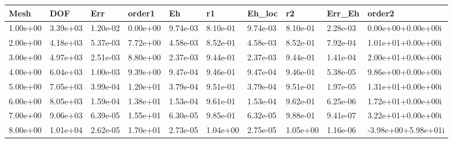 \begin{tabular}{llllllllll}
Mesh & DOF & Err & order1 & Eh & r1 & Eh_loc & r2 & Err_Eh & order2 \\ 
\hline 
1.00e+00 & 3.39e+03 & 1.20e-02 & 0.00e+00 & 9.74e-03 & 8.10e-01 & 9.74e-03 & 8.10e-01 & 2.28e-03 &  0.00e+00+0.00e+00i \\ 
2.00e+00 & 4.18e+03 & 5.37e-03 & 7.72e+00 & 4.58e-03 & 8.52e-01 & 4.58e-03 & 8.52e-01 & 7.92e-04 &  1.01e+01+0.00e+00i \\ 
3.00e+00 & 4.97e+03 & 2.51e-03 & 8.80e+00 & 2.37e-03 & 9.44e-01 & 2.37e-03 & 9.44e-01 & 1.41e-04 &  2.00e+01+0.00e+00i \\ 
4.00e+00 & 6.04e+03 & 1.00e-03 & 9.39e+00 & 9.47e-04 & 9.46e-01 & 9.47e-04 & 9.46e-01 & 5.38e-05 &  9.86e+00+0.00e+00i \\ 
5.00e+00 & 7.05e+03 & 3.99e-04 & 1.20e+01 & 3.79e-04 & 9.51e-01 & 3.79e-04 & 9.51e-01 & 1.97e-05 &  1.31e+01+0.00e+00i \\ 
6.00e+00 & 8.05e+03 & 1.59e-04 & 1.38e+01 & 1.53e-04 & 9.61e-01 & 1.53e-04 & 9.62e-01 & 6.25e-06 &  1.72e+01+0.00e+00i \\ 
7.00e+00 & 9.06e+03 & 6.39e-05 & 1.55e+01 & 6.30e-05 & 9.85e-01 & 6.32e-05 & 9.88e-01 & 9.41e-07 &  3.22e+01+0.00e+00i \\ 
8.00e+00 & 1.01e+04 & 2.62e-05 & 1.70e+01 & 2.73e-05 & 1.04e+00 & 2.75e-05 & 1.05e+00 & 1.16e-06 & -3.98e+00+5.98e+01i \\ 
\hline 
\end{tabular}